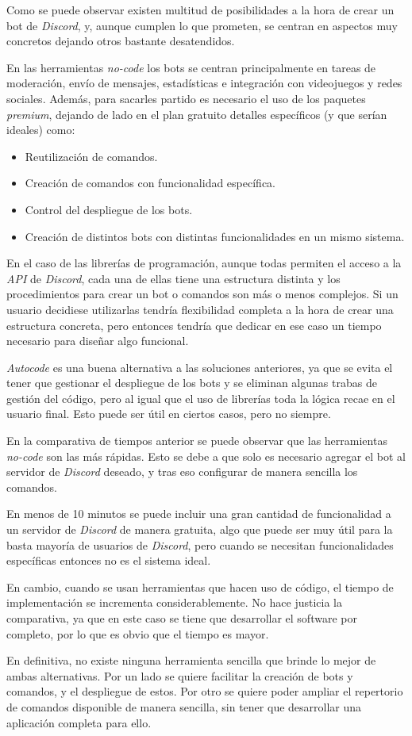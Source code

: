 Como se puede observar existen multitud de posibilidades a la hora de crear un bot de \textit{Discord}, y, aunque cumplen lo que prometen, se centran en aspectos muy concretos dejando otros bastante desatendidos.

En las herramientas \textit{no-code} los bots se centran principalmente en tareas de moderación, envío de mensajes, estadísticas e integración con videojuegos y redes sociales. Además, para sacarles partido es necesario el uso de los paquetes \textit{premium}, dejando de lado en el plan gratuito detalles específicos (y que serían ideales) como:

\begin{itemize}
	\item Reutilización de comandos.
	\item Creación de comandos con funcionalidad específica.
	\item Control del despliegue de los bots.
	\item Creación de distintos bots con distintas funcionalidades en un mismo sistema.
\end{itemize}

En el caso de las librerías de programación, aunque todas permiten el acceso a la \textit{API} de \textit{Discord}, cada una de ellas tiene una estructura distinta y los procedimientos para crear un bot o comandos son más o menos complejos. Si un usuario decidiese utilizarlas tendría flexibilidad completa a la hora de crear una estructura concreta, pero entonces tendría que dedicar en ese caso un tiempo necesario para diseñar algo funcional.

\textit{Autocode} es una buena alternativa a las soluciones anteriores, ya que se evita el tener que gestionar el despliegue de los bots y se eliminan algunas trabas de gestión del código, pero al igual que el uso de librerías toda la lógica recae en el usuario final. Esto puede ser útil en ciertos casos, pero no siempre.

En la comparativa de tiempos anterior se puede observar que las herramientas \textit{no-code} son las más rápidas. Esto se debe a que solo es necesario agregar el bot al servidor de \textit{Discord} deseado, y tras eso configurar de manera sencilla los comandos.

En menos de 10 minutos se puede incluir una gran cantidad de funcionalidad a un servidor de \textit{Discord} de manera gratuita, algo que puede ser muy útil para la basta mayoría de usuarios de \textit{Discord}, pero cuando se necesitan funcionalidades específicas entonces no es el sistema ideal.

En cambio, cuando se usan herramientas que hacen uso de código, el tiempo de implementación se incrementa considerablemente. No hace justicia la comparativa, ya que en este caso se tiene que desarrollar el software por completo, por lo que es obvio que el tiempo es mayor.

En definitiva, no existe ninguna herramienta sencilla que brinde lo mejor de ambas alternativas. Por un lado se quiere facilitar la creación de bots y comandos, y el despliegue de estos. Por otro se quiere poder ampliar el repertorio de comandos disponible de manera sencilla, sin tener que desarrollar una aplicación completa para ello.
